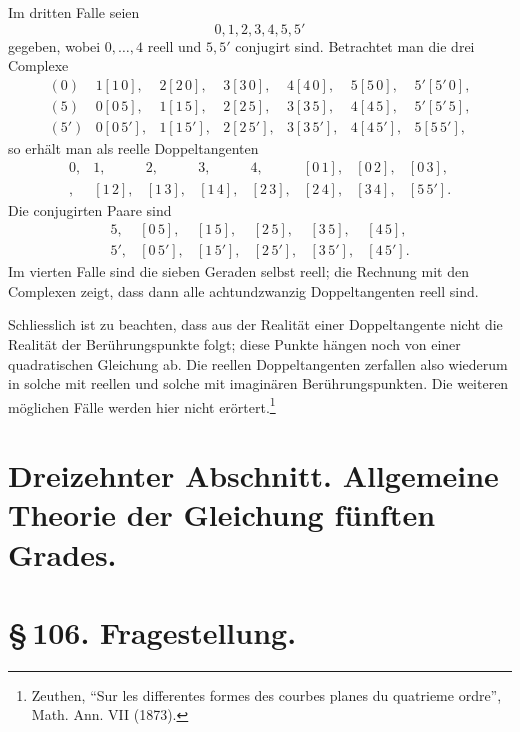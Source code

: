 \documentclass[11pt]{article}
\providecommand{\pair}[2]{[#1\,#2]}
\begin{document}
Im dritten Falle seien
\[
0,1,2,3,4,5,5'
\]
gegeben, wobei \(0,
\ldots,4\) reell und \(5,5'\) conjugirt sind. Betrachtet man die drei Complexe
\[
\begin{array}{rllllll}
(0)&1\pair{1}{0},&2\pair{2}{0},&3\pair{3}{0},&4\pair{4}{0},&5\pair{5}{0},&5'\pair{5'}{0},\\
(5)&0\pair{0}{5},&1\pair{1}{5},&2\pair{2}{5},&3\pair{3}{5},&4\pair{4}{5},&5'\pair{5'}{5},\\
(5')&0\pair{0}{5'},&1\pair{1}{5'},&2\pair{2}{5'},&3\pair{3}{5'},&4\pair{4}{5'},&5\pair{5}{5'},
\end{array}
\]
so erhält man als reelle Doppeltangenten
\[
\begin{array}{llllllll}
0,&1,&2,&3,&4,&\pair{0}{1},&\pair{0}{2},&\pair{0}{3},\\
\pair{0}{4},&\pair{1}{2},&\pair{1}{3},&\pair{1}{4},&\pair{2}{3},&\pair{2}{4},&\pair{3}{4},&\pair{5}{5'}.
\end{array}
\]
Die conjugirten Paare sind
\[
\begin{array}{llllll}
5,&\pair{0}{5},&\pair{1}{5},&\pair{2}{5},&\pair{3}{5},&\pair{4}{5},\\
5',&\pair{0}{5'},&\pair{1}{5'},&\pair{2}{5'},&\pair{3}{5'},&\pair{4}{5'}.
\end{array}
\]
Im vierten Falle sind die sieben Geraden selbst reell; die Rechnung mit den Complexen zeigt, dass dann alle achtundzwanzig Doppeltangenten reell sind.

Schliesslich ist zu beachten, dass aus der Realität einer Doppeltangente nicht die Realität der Berührungspunkte folgt; diese Punkte hängen noch von einer quadratischen Gleichung ab. Die reellen Doppeltangenten zerfallen also wiederum in solche mit reellen und solche mit imaginären Berührungspunkten. Die weiteren möglichen Fälle werden hier nicht erörtert.\footnote{Zeuthen, ``Sur les differentes formes des courbes planes du quatrieme ordre'', Math. Ann. VII (1873).}



\section*{Dreizehnter Abschnitt. Allgemeine Theorie der Gleichung fünften Grades.}

\section*{\S\,106. Fragestellung.}
\end{document}

